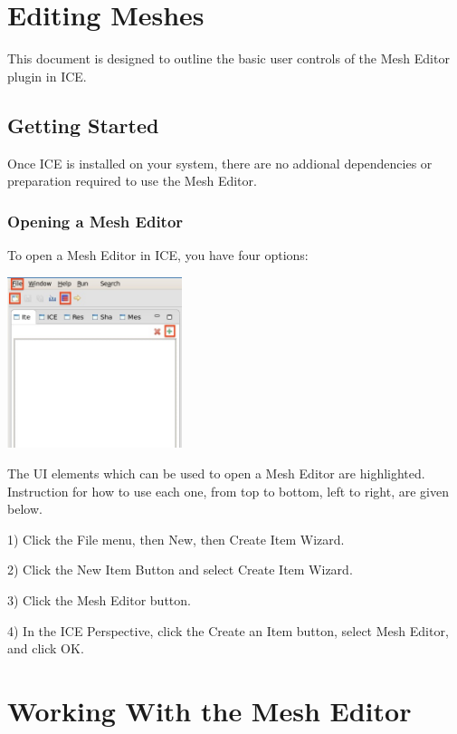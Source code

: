 \documentclass{article}
\begin{document}
\section{Editing Meshes}

This document is designed to outline the basic user controls of the Mesh Editor plugin in ICE.

\subsection{Getting Started}

Once ICE is installed on your system, there are no addional dependencies or
preparation required to use the Mesh Editor.

\subsubsection{Opening a Mesh Editor}

To open a Mesh Editor in ICE, you have four options:
 

\begin{center}
\includegraphics[height=5cm]{images/CreateNewMeshOptions.jpg}
\end{center}

The UI elements which can be used to open a Mesh Editor are
highlighted. Instruction for how to use each one, from top to bottom, left to
right, are given below.


1) Click the File menu, then New, then Create Item Wizard.


2) Click the New Item Button and select Create Item Wizard.


3) Click the Mesh Editor button.


4) In the ICE Perspective, click the Create an Item button, select Mesh Editor,
and click OK.

\section{Working With the Mesh Editor}
\end{document}

